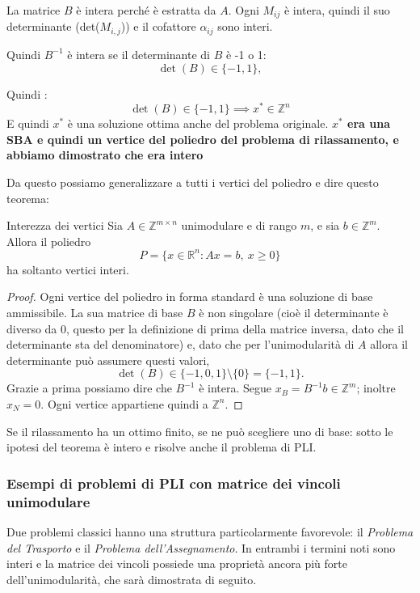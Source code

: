 La matrice \(B\) è intera perché è estratta da \(A\).
Ogni \(M_{ij}\) è intera, quindi il suo determinante (det($M_{i,j}$)) e
il cofattore \(\alpha_{ij}\) sono interi.

Quindi $B^{-1}$ è intera se il determinante di $B$ è -1 o 1:
\[
\det(B)\in\{-1,1\},
\]

Quindi :
\[
\det(B)\in\{-1,1\} \implies x^* \in \mathbb{Z}^n
\]
E quindi $x^*$ è una soluzione ottima anche del problema originale.
\textbf{$x^*$ era una SBA e quindi un vertice del poliedro del problema di rilassamento, e abbiamo dimostrato che era intero}

Da questo possiamo generalizzare a tutti i vertici del poliedro e dire questo teorema:
\begin{theorem}{Interezza dei vertici}
\label{thm:vertici-interi}
Sia \(A\in\mathbb Z^{m\times n}\) unimodulare e di rango \(m\),
e sia \(b\in\mathbb Z^m\). Allora il poliedro
\[
P=\{x\in\mathbb R^n:Ax=b,\ x\geq0\}
\]
ha soltanto vertici interi.
\end{theorem}

\begin{proof}
Ogni vertice del poliedro in forma standard è una soluzione
di base ammissibile. La sua matrice di base \(B\) è non singolare (cioè il determinante è diverso da 0, questo per la definizione di prima della matrice inversa, dato che il determinante sta del denominatore)
e, dato che per l'unimodularità di \(A\) allora il determinante può assumere questi valori,
\[
\det(B)\in\{-1,0,1\}\setminus\{0\}=\{-1,1\}.
\]
Grazie a prima possiamo dire che  \(B^{-1}\) è intera.
Segue \(x_B=B^{-1}b\in\mathbb Z^m\); inoltre \(x_N=0\).
Ogni vertice appartiene quindi a \(\mathbb Z^n\).
\end{proof}


Se il rilassamento ha un ottimo finito, se ne può scegliere uno
di base: sotto le ipotesi del teorema è intero e risolve
anche il problema di PLI.


\newpage

\subsubsection*{Esempi di problemi di PLI con matrice dei vincoli unimodulare}

Due problemi classici hanno una struttura particolarmente favorevole:
il \emph{Problema del Trasporto} e il \emph{Problema dell'Assegnamento}.
In entrambi i termini noti sono interi e la matrice dei vincoli
possiede una proprietà ancora più forte dell'unimodularità,
che sarà dimostrata di seguito.

